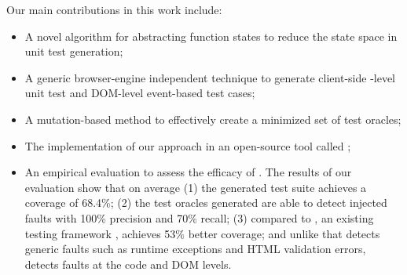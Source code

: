 Our main contributions in this work include:
\begin{itemize}[noitemsep, nolistsep]
\item A novel algorithm for abstracting function states to reduce the state space in unit test generation;%
\item A generic browser-engine independent technique to generate client-side \javascript-level unit test and DOM-level event-based test cases;
\item A mutation-based method to effectively create a minimized set of test oracles; %
\item The implementation of our approach in an open-source tool called \tool;%
\item An empirical evaluation to assess the efficacy of \tool.
The results of our evaluation show that on average (1) the generated test suite achieves a coverage of 68.4\%;
(2) the test oracles generated are able to detect injected faults with 100\% precision and 70\% recall; (3)  
 compared to \artemis, an existing \javascript testing framework \cite{artzi:icse11}, \tool achieves 53\% better coverage; and unlike \artemis that detects generic faults such as runtime exceptions and HTML validation errors, \tool detects faults at the \javascript code and DOM levels. 
\end{itemize} 



